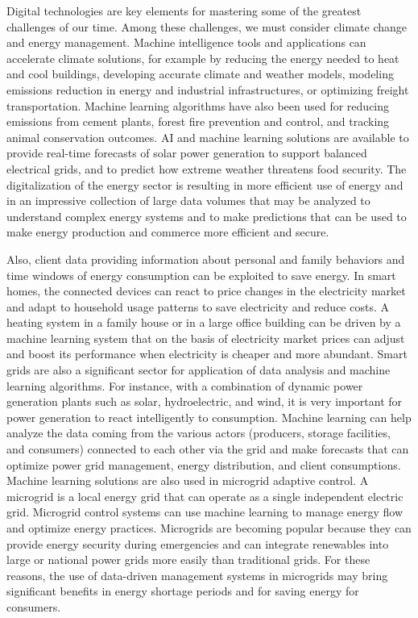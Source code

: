Digital technologies are key elements for mastering some of the greatest challenges of our time. Among these challenges, we must consider climate change and energy management. Machine intelligence tools and applications can accelerate climate solutions, for example by reducing the energy needed to heat and cool buildings, developing accurate climate and weather models, modeling emissions reduction in energy and industrial infrastructures, or optimizing freight transportation. Machine learning algorithms have also been used for reducing emissions from cement plants, forest fire prevention and control, and tracking animal conservation outcomes. AI and machine learning solutions are available to provide real-time forecasts of solar power generation to support balanced electrical grids, and to predict how extreme weather threatens food security. The digitalization of the energy sector is resulting in more efficient use of energy and in an impressive collection of large data volumes that may be analyzed to understand complex energy systems and to make predictions that can be used to make energy production and commerce more efficient and secure.

Also, client data providing information about personal and family behaviors and time windows of energy consumption can be exploited to save energy. In smart homes, the connected devices can react to price changes in the electricity market and adapt to household usage patterns to save electricity and reduce costs. A heating system in a family house or in a large office building can be driven by a machine learning system that on the basis of electricity market prices can adjust and boost its performance when electricity is cheaper and more abundant. Smart grids are also a significant sector for application of data analysis and machine learning algorithms. For instance, with a combination of dynamic power generation plants such as solar, hydroelectric, and wind, it is very important for power generation to react intelligently to consumption. Machine learning can help analyze the data coming from the various actors (producers, storage facilities, and consumers) connected to each other via the grid and make forecasts that can optimize power grid management, energy distribution, and client consumptions. Machine learning solutions are also used in microgrid adaptive control. A microgrid is a local energy grid that can operate as a single independent electric grid. Microgrid control systems can use machine learning to manage energy flow and optimize energy practices. Microgrids are becoming popular because they can provide energy security during emergencies and can integrate renewables into large or national power grids more easily than traditional grids. For these reasons, the use of data-driven management systems in microgrids may bring significant benefits in energy shortage periods and for saving energy for consumers.

